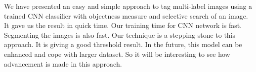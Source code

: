 We have presented an easy and simple approach to tag multi-label images using a trained CNN classifier with objectness measure and selective search of an image. It gave us the result in quick time. Our training time for CNN network is fast. Segmenting the images is also fast. Our technique is a stepping stone to this approach. It is giving a good threshold result. In the future, this model can be enhanced and cope with larger dataset. So it will be interesting to see how advancement is made in this approach.